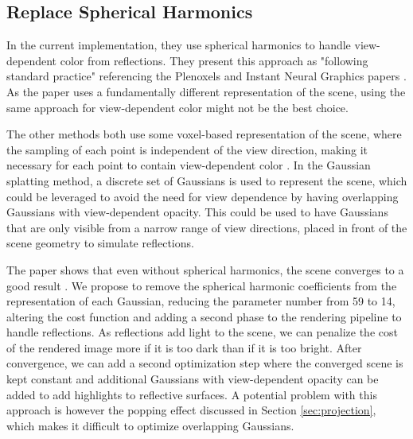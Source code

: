 \subsection{Replace Spherical Harmonics}
\label{sec:spherical_harmonics}
In the current implementation, they use spherical harmonics to handle view-dependent color from reflections.
They present this approach as "following standard practice" referencing the Plenoxels and Instant Neural Graphics papers \cite{yuPlenoxelsRadianceFields2021a}\cite{mullerInstantNeuralGraphics2022}.
As the paper uses a fundamentally different representation of the scene, using the same approach for view-dependent color might not be the best choice.

The other methods both use some voxel-based representation of the scene,
where the sampling of each point is independent of the view direction,
making it necessary for each point to contain view-dependent color \cite{yuPlenoxelsRadianceFields2021a}\cite{mullerInstantNeuralGraphics2022}.
In the Gaussian splatting method, a discrete set of Gaussians is used to represent the scene, which could be leveraged to avoid the need for view dependence by having overlapping Gaussians with view-dependent opacity.
This could be used to have Gaussians that are only visible from a narrow range of view directions, placed in front of the scene geometry to simulate reflections.

The paper shows that even without spherical harmonics, the scene converges to a good result \cite[Table 3]{kerbl3DGaussianSplatting2023}.
We propose to remove the spherical harmonic coefficients from the representation of each Gaussian, reducing the parameter number from 59 to 14, altering the cost function and adding a second phase to the rendering pipeline to handle reflections.
As reflections add light to the scene, we can penalize the cost of the rendered image more if it is too dark than if it is too bright.
After convergence, we can add a second optimization step where the converged scene is kept constant and additional Gaussians with view-dependent opacity can be added to add highlights to reflective surfaces. A potential problem with this approach is however the popping effect discussed in Section \ref{sec:projection}, which makes it difficult to optimize overlapping Gaussians.